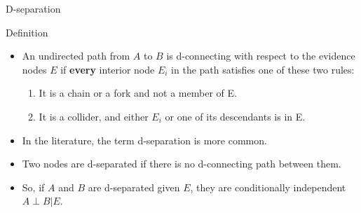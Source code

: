 \documentclass[handout]{beamer}
\begin{document}
\begin{frame}{D-separation}

\begin{block}{Definition}
 \begin{itemize}

\item An undirected path from $A$ to $B$ is d-connecting with respect to the evidence nodes $E$ if \textbf{every} interior node $E_i$ in the path satisfies one of these two rules:

\begin{enumerate}
 \item It is a chain or a fork and not a member of E.
 \item It is a collider, and either $E_i$ or one of its descendants is in E.
\end{enumerate}
 
 
\end{itemize}

\end{block}



\begin{itemize}


\item In the literature, the term d-separation is more common.

\item Two nodes are d-separated if there is no d-connecting path between them.


\item So, if $A$ and $B$ are d-separated given $E$, they are conditionally independent $A \perp B |E$. 

 
 
\end{itemize}





\end{frame}
\end{document}
